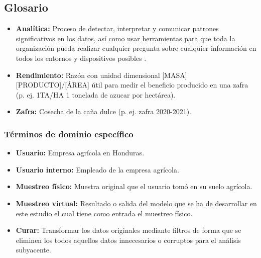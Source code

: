 \documentclass{report}
\begin{document}
\subsection{Glosario}

\begin{itemize}
    \item \textbf{Analítica:} Proceso de detectar, interpretar y comunicar patrones significativos en los datos, así como usar herramientas para que toda la organización pueda realizar cualquier pregunta sobre cualquier información en todos los entornos y dispositivos posibles \cite{oracle-2021}.
    
    \item \textbf{Rendimiento:} Razón con unidad dimensional [MASA][PRODUCTO]/[ÁREA] útil para medir el beneficio producido en una zafra (p. ej. 1TA/HA 1 tonelada de azucar por hectárea).
    
    \item \textbf{Zafra:} Cosecha de la caña dulce (p. ej. zafra 2020-2021).
\end{itemize}

\subsubsection{Términos de dominio específico}

\begin{itemize}
    \item \textbf{Usuario:} Empresa agrícola en Honduras.
    
    \item \textbf{Usuario interno:} Empleado de la empresa agrícola.
    
    \item \textbf{Muestreo físico:} Muestra original que el usuario tomó en su suelo agrícola.
    
    \item \textbf{Muestreo virtual:} Resultado o salida del modelo que se ha de desarrollar en este estudio el cual tiene como entrada el muestreo físico.
    
    \item \textbf{Curar:} Transformar los datos originales mediante filtros de forma que se eliminen los todos aquellos datos innecesarios o corruptos para el análisis subyacente.
\end{itemize}

\printbibliography
\end{document}

